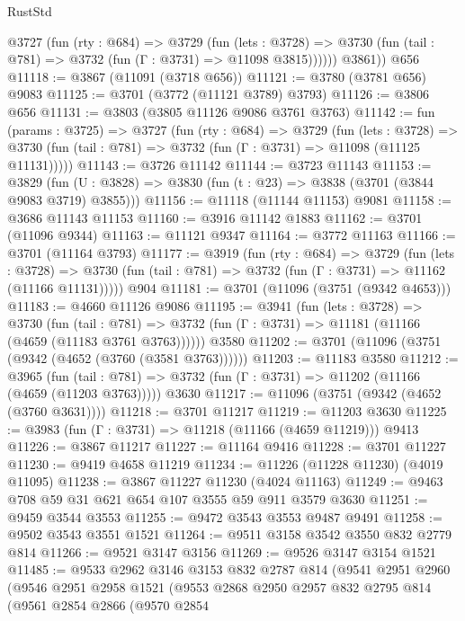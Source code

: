 \begin{lexlean}{RustStd}
\begin{coremodule}
          @3727
            (fun (rty : @684) =>
            @3729
              (fun (lets : @3728) =>
              @3730 (fun (tail : @781) => @3732 (fun (Γ : @3731) => @11098 @3815))))))
        @3861))
    @656
@11118 := @3867 (@11091 (@3718 @656))
@11121 := @3780 (@3781 @656) @9083
@11125 := @3701 (@3772 (@11121 @3789) @3793)
@11126 := @3806 @656
@11131 := @3803 (@3805 @11126 @9086 @3761 @3763)
@11142 := fun (params : @3725) =>
  @3727
    (fun (rty : @684) =>
    @3729
      (fun (lets : @3728) =>
      @3730 (fun (tail : @781) => @3732 (fun (Γ : @3731) => @11098 (@11125 @11131)))))
@11143 := @3726 @11142
@11144 := @3723 @11143
@11153 := @3829
    (fun (U : @3828) => @3830 (fun (t : @23) => @3838 (@3701 (@3844 @9083 @3719) @3855)))
@11156 := @11118 (@11144 @11153) @9081
@11158 := @3686 @11143 @11153
@11160 := @3916 @11142 @1883
@11162 := @3701 (@11096 @9344)
@11163 := @11121 @9347
@11164 := @3772 @11163
@11166 := @3701 (@11164 @3793)
@11177 := @3919
    (fun (rty : @684) =>
    @3729
      (fun (lets : @3728) =>
      @3730 (fun (tail : @781) => @3732 (fun (Γ : @3731) => @11162 (@11166 @11131)))))
    @904
@11181 := @3701 (@11096 (@3751 (@9342 @4653)))
@11183 := @4660 @11126 @9086
@11195 := @3941
    (fun (lets : @3728) =>
    @3730
      (fun (tail : @781) =>
      @3732 (fun (Γ : @3731) => @11181 (@11166 (@4659 (@11183 @3761 @3763))))))
    @3580
@11202 := @3701 (@11096 (@3751 (@9342 (@4652 (@3760 (@3581 @3763))))))
@11203 := @11183 @3580
@11212 := @3965
    (fun (tail : @781) => @3732 (fun (Γ : @3731) => @11202 (@11166 (@4659 (@11203 @3763)))))
    @3630
@11217 := @11096 (@3751 (@9342 (@4652 (@3760 @3631))))
@11218 := @3701 @11217
@11219 := @11203 @3630
@11225 := @3983 (fun (Γ : @3731) => @11218 (@11166 (@4659 @11219))) @9413
@11226 := @3867 @11217
@11227 := @11164 @9416
@11228 := @3701 @11227
@11230 := @9419 @4658 @11219
@11234 := @11226 (@11228 @11230) (@4019 @11095)
@11238 := @3867 @11227 @11230 (@4024 @11163)
@11249 := @9463 @708 @59 @31 @621 @654 @107 @3555 @59 @911 @3579 @3630
@11251 := @9459 @3544 @3553
@11255 := @9472 @3543 @3553 @9487 @9491
@11258 := @9502 @3543 @3551 @1521
@11264 := @9511 @3158 @3542 @3550 @832 @2779 @814
@11266 := @9521 @3147 @3156
@11269 := @9526 @3147 @3154 @1521
@11485 := @9533
    @2962
    @3146
    @3153
    @832
    @2787
    @814
    (@9541
      @2951
      @2960
      (@9546
        @2951
        @2958
        @1521
        (@9553
          @2868
          @2950
          @2957
          @832
          @2795
          @814
          (@9561
            @2854
            @2866
            (@9570
              @2854

\end{coremodule}
\end{lexlean}
